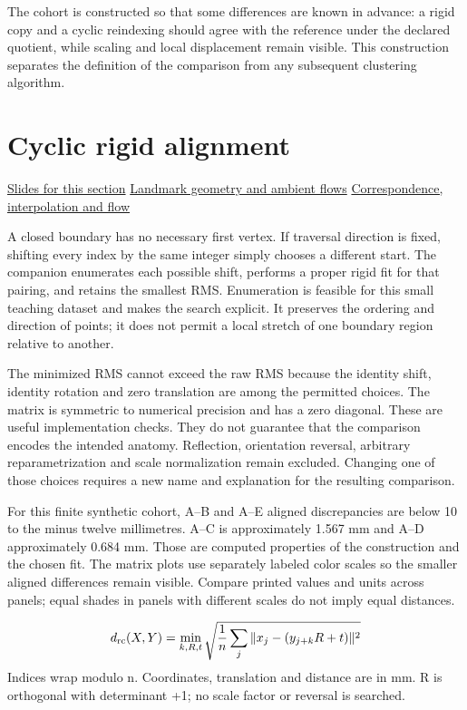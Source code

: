 \documentclass[11pt,letterpaper]{article}
\theoremstyle{definition}\newtheorem{definition}{Definition}\newtheorem{example}{Example}
\numberwithin{equation}{section}
\begin{document}
The cohort is constructed so that some differences are known in advance: a rigid copy and a cyclic reindexing should agree with the reference under the declared quotient, while scaling and local displacement remain visible. This construction separates the definition of the comparison from any subsequent clustering algorithm.
\section{Cyclic rigid alignment}
\hypertarget{note-cyclic-rigid-alignment}{}\label{note:cyclic-rigid-alignment}
{\small \href{slides.html\#frame=cyclic-rigid-discrepancy\&step=1}{Slides for this section} \quad \href{../modules/shape-lab/index.html}{Landmark geometry and ambient flows} \quad \href{../modules/animations/landmark-flow.html}{Correspondence, interpolation and flow}}\par
A closed boundary has no necessary first vertex. If traversal direction is fixed, shifting every index by the same integer simply chooses a different start. The companion enumerates each possible shift, performs a proper rigid fit for that pairing, and retains the smallest RMS. Enumeration is feasible for this small teaching dataset and makes the search explicit. It preserves the ordering and direction of points; it does not permit a local stretch of one boundary region relative to another.

The minimized RMS cannot exceed the raw RMS because the identity shift, identity rotation and zero translation are among the permitted choices. The matrix is symmetric to numerical precision and has a zero diagonal. These are useful implementation checks. They do not guarantee that the comparison encodes the intended anatomy. Reflection, orientation reversal, arbitrary reparametrization and scale normalization remain excluded. Changing one of those choices requires a new name and explanation for the resulting comparison.

For this finite synthetic cohort, A--B and A--E aligned discrepancies are below 10 to the minus twelve millimetres. A--C is approximately 1.567 mm and A--D approximately 0.684 mm. Those are computed properties of the construction and the chosen fit. The matrix plots use separately labeled color scales so the smaller aligned differences remain visible. Compare printed values and units across panels; equal shades in panels with different scales do not imply equal distances.

\[
d_{\rm rc}(X,Y)=\min_{k,R,t}\sqrt{\frac1n\sum_j\|x_j-(y_{j+k}R+t)\|^2}
\]
Indices wrap modulo n. Coordinates, translation and distance are in mm. R is orthogonal with determinant +1; no scale factor or reversal is searched.
\end{document}
